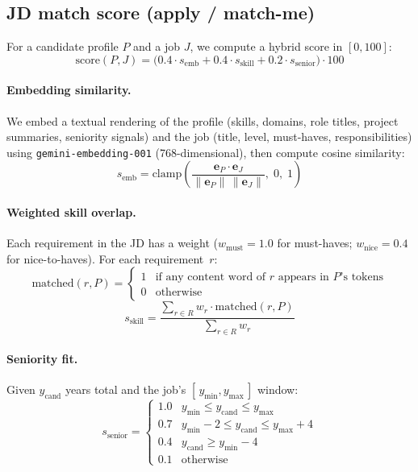 \documentclass[11pt,a4paper]{article}
\begin{document}
\subsection{JD match score (apply / match-me)}

For a candidate profile $P$ and a job $J$, we compute a hybrid score
in $[0, 100]$:
\begin{equation}
\mathrm{score}(P, J) = \bigl(0.4 \cdot s_{\text{emb}} + 0.4 \cdot s_{\text{skill}} + 0.2 \cdot s_{\text{senior}}\bigr) \cdot 100
\end{equation}

\paragraph{Embedding similarity.} We embed a textual rendering of the
profile (skills, domains, role titles, project summaries, seniority
signals) and the job (title, level, must-haves, responsibilities) using
\texttt{gemini-embedding-001} (768-dimensional), then compute cosine
similarity:
\begin{equation}
s_{\text{emb}} = \mathrm{clamp}\!\left(\frac{\mathbf{e}_P \cdot \mathbf{e}_J}{\lVert \mathbf{e}_P \rVert\,\lVert \mathbf{e}_J \rVert},\; 0,\; 1\right)
\end{equation}

\paragraph{Weighted skill overlap.} Each requirement in the JD has a
weight ($w_{\text{must}} = 1.0$ for must-haves; $w_{\text{nice}} = 0.4$
for nice-to-haves). For each requirement~$r$:
\begin{equation}
\mathrm{matched}(r, P) = \begin{cases}
1 & \text{if any content word of } r \text{ appears in } P\text{'s tokens} \\
0 & \text{otherwise}
\end{cases}
\end{equation}
\begin{equation}
s_{\text{skill}} = \frac{\sum_{r \in R} w_r \cdot \mathrm{matched}(r, P)}{\sum_{r \in R} w_r}
\end{equation}

\paragraph{Seniority fit.} Given $y_{\text{cand}}$ years total and the
job's $[\,y_{\min}, y_{\max}\,]$ window:
\begin{equation}
s_{\text{senior}} = \begin{cases}
1.0 & y_{\min} \le y_{\text{cand}} \le y_{\max} \\
0.7 & y_{\min}-2 \le y_{\text{cand}} \le y_{\max}+4 \\
0.4 & y_{\text{cand}} \ge y_{\min}-4 \\
0.1 & \text{otherwise}
\end{cases}
\end{equation}
\end{document}
